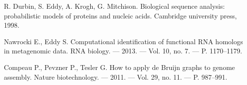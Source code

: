 \begin{thebibliography}{99}
  R. Durbin, S. Eddy, A. Krogh, G. Mitchison.
  Biological sequence analysis: probabilistic models of proteins and nucleic acids.
  Cambridge university press, 1998.

  Nawrocki E., Eddy S.
  Computational identification of functional RNA homologs in metagenomic data.
  RNA biology. –– 2013. –– Vol. 10, no. 7. –– P. 1170–1179.

  Compeau P., Pevzner P., Tesler G. 
  How to apply de Bruijn graphs to genome assembly.
   Nature biotechnology. –– 2011. –– Vol. 29, no. 11. –– P. 987–991.

\end{thebibliography}
